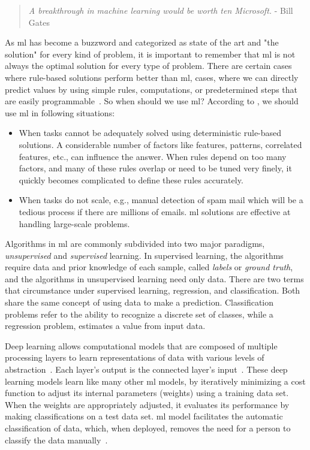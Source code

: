 \begin{quote}
    \emph{A breakthrough in machine learning would be worth ten Microsoft.} - Bill Gates
\end{quote}

As \Ac{ml} has become a buzzword and categorized as state of the art and "the solution" for every kind of problem, it is important to remember that \ac{ml} is not always the optimal solution for every type of problem. There are certain cases where rule-based solutions perform better than \ac{ml}, cases, where we can directly predict values by using simple rules, computations, or predetermined steps that are easily programmable~\cite{aws}. So when should we use \ac{ml}? According to \cite{aws}, we should use \ac{ml} in following situations:

\begin{itemize}
    \item When tasks cannot be adequately solved using deterministic rule-based solutions. A considerable number of factors like features, patterns, correlated features, etc., can influence the answer. When rules depend on too many factors, and many of these rules overlap or need to be tuned very finely, it quickly becomes complicated to define these rules accurately.
    \item When tasks do not scale, e.g., manual detection of spam mail which will be a tedious process if there are millions of emails. \ac{ml} solutions are effective at handling large-scale problems.
\end{itemize}

Algorithms in \Ac{ml} are commonly subdivided into two major paradigms, \emph{unsupervised} and \emph{supervised} learning. In supervised learning, the algorithms require data and prior knowledge of each sample, called \emph{labels} or \emph{ground truth}, and the algorithms in unsupervised learning need only data. There are two terms that circumstance under supervised learning, regression, and classification. Both share the same concept of using data to make a prediction. Classification problems refer to the ability to recognize a discrete set of classes, while a regression problem, estimates a value from input data.

Deep learning allows computational models that are composed of multiple processing layers to learn representations of data with various levels of abstraction~\cite{lecun2015deep}. Each layer's output is the connected layer's input~\cite{mike_voets}. These deep learning models learn like many other \ac{ml} models, by iteratively minimizing a cost function to adjust its internal parameters (weights) using a training data set. When the weights are appropriately adjusted, it evaluates its performance by making classifications on a test data set. \ac{ml} model facilitates the automatic classification of data, which, when deployed, removes the need for a person to classify the data manually~\cite{mike_voets}.

